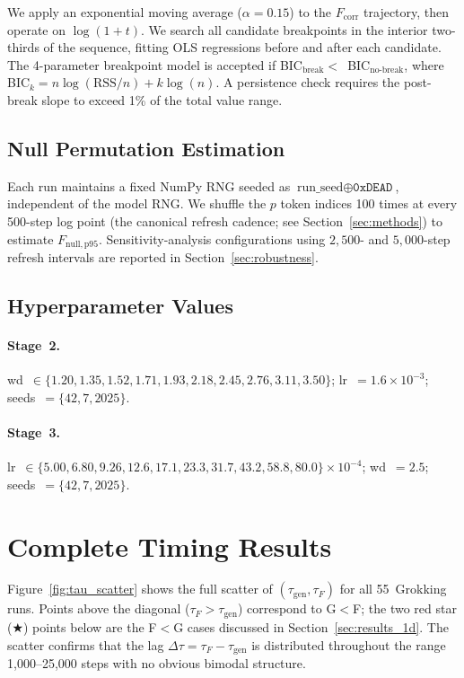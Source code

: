 \documentclass{article}
\newcommand{\taug}{\tau_{\mathrm{gen}}}
\newcommand{\tauf}{\tau_{F}}
\newcommand{\Dtau}{\Delta\tau}
\newcommand{\fcorr}{F_{\mathrm{corr}}}
\begin{document}
We apply an exponential moving average ($\alpha{=}0.15$) to the
$\fcorr$ trajectory, then operate on $\log(1+t)$.
We search all candidate breakpoints in the interior two-thirds of
the sequence, fitting OLS regressions before and after each candidate.
The 4-parameter breakpoint model is accepted if BIC$_{\text{break}}
<$~BIC$_{\text{no-break}}$, where BIC$_k = n\log(\text{RSS}/n)
+ k\log(n)$.
A persistence check requires the post-break slope to exceed 1\% of
the total value range.

\subsection{Null Permutation Estimation}

Each run maintains a fixed NumPy RNG seeded as
$\text{run\_seed}\oplus\texttt{0xDEAD}$, independent of the model
RNG.
We shuffle the $p$ token indices 100 times at every 500-step log
point (the canonical refresh cadence; see
Section~\ref{sec:methods}) to estimate $F_{\mathrm{null,p95}}$.
Sensitivity-analysis configurations using $2{,}500$- and
$5{,}000$-step refresh intervals are reported in
Section~\ref{sec:robustness}.

\subsection{Hyperparameter Values}

\paragraph{Stage~2.}
wd~$\in\{1.20, 1.35, 1.52, 1.71, 1.93, 2.18, 2.45, 2.76, 3.11,
3.50\}$; lr~$=1.6\times10^{-3}$; seeds~$=\{42,7,2025\}$.

\paragraph{Stage~3.}
lr~$\in\{5.00, 6.80, 9.26, 12.6, 17.1, 23.3, 31.7, 43.2, 58.8,
80.0\}\times10^{-4}$; wd~$=2.5$; seeds~$=\{42,7,2025\}$.

\section{Complete Timing Results}
\label{app:scatter}

Figure~\ref{fig:tau_scatter} shows the full scatter of $(\taug,\tauf)$
for all 55~Grokking runs.
Points above the diagonal ($\tauf>\taug$) correspond to G$<$F;
the two red star ($\bigstar$) points below are the F$<$G cases discussed in
Section~\ref{sec:results_1d}.
The scatter confirms that the lag $\Dtau=\tauf-\taug$ is
distributed throughout the range 1{,}000--25{,}000 steps with no
obvious bimodal structure.
\end{document}
